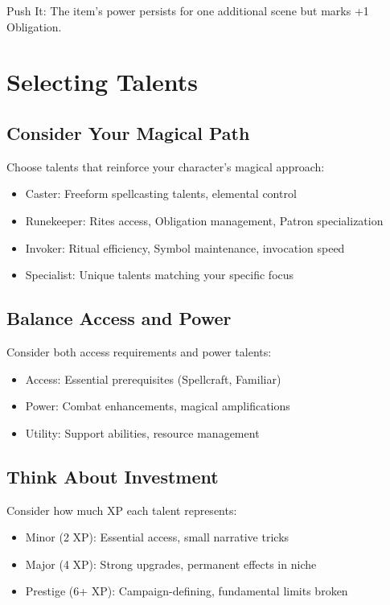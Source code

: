 \documentclass[11pt,twoside,openany]{book}
\begin{document}
Push It: The item's power persists for one additional scene but marks +1 Obligation.

\section*{Selecting Talents} 

\subsection*{Consider Your Magical Path}

Choose talents that reinforce your character's magical approach:
\begin{itemize}
\item Caster: Freeform spellcasting talents, elemental control
\item Runekeeper: Rites access, Obligation management, Patron specialization
\item Invoker: Ritual efficiency, Symbol maintenance, invocation speed
\item Specialist: Unique talents matching your specific focus
\end{itemize}

\subsection*{Balance Access and Power}

Consider both access requirements and power talents:
\begin{itemize}
\item Access: Essential prerequisites (Spellcraft, Familiar)
\item Power: Combat enhancements, magical amplifications
\item Utility: Support abilities, resource management
\end{itemize}

\subsection*{Think About Investment}

Consider how much XP each talent represents:
\begin{itemize}
\item Minor (2 XP): Essential access, small narrative tricks
\item Major (4 XP): Strong upgrades, permanent effects in niche
\item Prestige (6+ XP): Campaign-defining, fundamental limits broken
\end{itemize}
\end{document}
